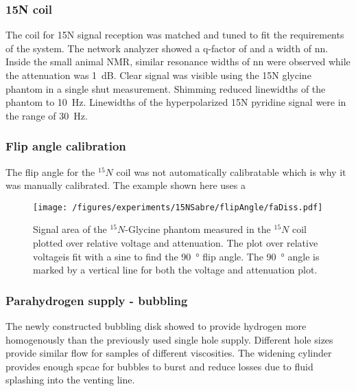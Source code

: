         \subsubsection{15N coil}
            The coil for 15N signal reception was matched and tuned to fit the requirements of the system. The network analyzer showed a q-factor of  and a width of nn. Inside the small animal NMR, similar resonance widths of nn were observed while the attenuation was \SI{1}{\deci\bel}. Clear signal was visible using the 15N glycine phantom in a single shut measurement. Shimming reduced linewidths of the phantom to \SI{10}{\hertz}. Linewidths of the hyperpolarized 15N pyridine signal were in the range of \SI{30}{\hertz}.
        \subsubsection{Flip angle calibration}
            The flip angle for the $^{15}N$ coil was not automatically calibratable which is why it was manually calibrated. The example shown here uses a 
            \begin{figure}
                \label{fig:results:15N:flipAngle}
                \texttt{[image: /figures/experiments/15NSabre/flipAngle/faDiss.pdf]}
                \caption{Signal area of the $^{15}N$-Glycine phantom measured in the $^{15}N$ coil plotted over relative voltage and attenuation. The plot over relative voltageis fit with a sine to find the \SI{90}{\degree} flip angle. The \SI{90}{\degree} angle is marked by a vertical line for both the voltage and attenuation plot.}
            \end{figure}
        \subsubsection{Parahydrogen supply - bubbling}
            The newly constructed bubbling disk showed to provide hydrogen more homogenously than the previously used single hole supply. Different hole sizes provide similar flow for samples of different viscosities. The widening cylinder provides enough spcae for bubbles to burst and reduce losses due to fluid splashing into the venting line.

